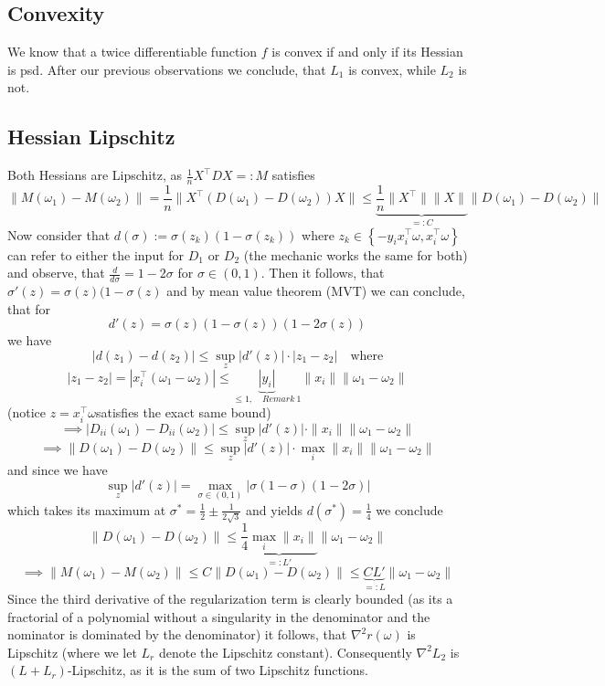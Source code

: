 \documentclass{article}
\begin{document}
\subsection{Convexity}
We know that a twice differentiable function $f$ is convex if and only if its Hessian is psd. After our previous observations we conclude, that $L_1$ is convex, while $L_2$ is not.

\subsection{Hessian Lipschitz}
Both Hessians are Lipschitz, as $ \frac{1}{n} X ^\top D X =:M$ satisfies
$$ \| M(\omega _1)-M(\omega _2)\| = \frac{1}{n}\| X^\top (D(\omega_1)-D(\omega_2))X \| \leq \underbrace{\frac{1}{n} \|X^\top \| \|X\| }_{=:C}\|D(\omega_1)-D(\omega_2)\|$$
Now consider that $d(\sigma) := \sigma(z_k)(1- \sigma(z_k))$ where $z_k \in \left\{ -y_i x_i ^\top \omega,x_i ^\top \omega \right\}$ can refer to either the input for $D_1$ or $D_2$ (the mechanic works the same for both) and observe, that $\frac{d}{d\sigma} = 1-2\sigma$ for $\sigma \in (0,1)$. Then it follows, that $\sigma '(z) = \sigma (z) (1-\sigma(z)$ and by mean value theorem (MVT) we can conclude, that for
\[
d'(z) = \sigma(z)(1 - \sigma(z))(1 - 2\sigma(z))
\]
we have 
\[
|d(z_1) - d(z_2)| \leq \sup_z |d'(z)| \cdot |z_1 - z_2| \quad \text{where}
\]
\[
|z_1 - z_2| = | x_i^\top (\omega_1 - \omega_2)| \leq \underbrace{|y_i|}_{\leq 1, \quad  Remark\ 1} \|x_i\| \|\omega_1 - \omega_2\|
\]
(notice $z=x_i^\top \omega$satisfies the exact same bound)
\[
\implies |D_{ii}(\omega_1) - D_{ii}(\omega_2)| \leq \sup_z |d'(z)| \cdot \|x_i\| \|\omega_1 - \omega_2\|
\]
\[
\implies \|D(\omega_1) - D(\omega_2)\| \leq \sup_z |d'(z)| \cdot \max_i \|x_i\| \|\omega_1 - \omega_2\|
\]
and since we have
\[
\sup_z |d'(z)| = \max _{\sigma \in (0,1)} |\sigma (1-\sigma)(1-2 \sigma)|
\]
which takes its maximum at $\sigma^* = \frac{1}{2} \pm \frac{1}{2\sqrt{3}}$ and yields $d(\sigma ^*) = \frac{1}{4}$ we conclude
\[
\|D(\omega_1) - D(\omega_2)\| \leq \underbrace{\frac{1}{4} \max_i \|x_i\|}_{=:L'} \|\omega_1 - \omega_2\|
\]
$$\implies \| M(\omega _1)-M(\omega _2)\| \leq C \|D(\omega_1)-D(\omega_2)\| \leq \underbrace{C L'}_{=:L} \|\omega_1 - \omega_2 \| $$
Since the third derivative of the regularization term is clearly bounded (as its a fractorial of a polynomial without a singularity in the denominator and the nominator is dominated by the denominator) it follows, that $\nabla^2 r(\omega)$ is Lipschitz (where we let $L_r$ denote the Lipschitz constant). Consequently $\nabla^2 L_2$ is $(L+L_{r})$-Lipschitz, as it is the sum of two Lipschitz functions.
%
\end{document}
